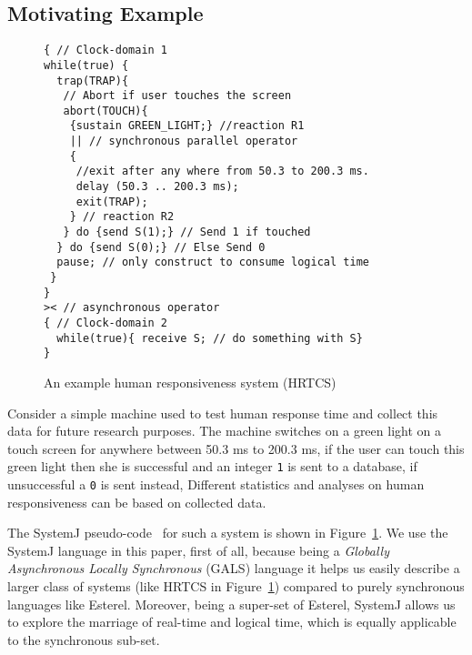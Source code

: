 \subsection{Motivating Example}
\label{sec:motivating-example}

\begin{figure}[t!]
\begin{minipage}{5cm}
  \begin{scriptsize}
    
\begin{verbatim}
{ // Clock-domain 1
while(true) {
  trap(TRAP){
   // Abort if user touches the screen
   abort(TOUCH){
    {sustain GREEN_LIGHT;} //reaction R1
    || // synchronous parallel operator
    {
     //exit after any where from 50.3 to 200.3 ms.
     delay (50.3 .. 200.3 ms); 
     exit(TRAP); 
    } // reaction R2
   } do {send S(1);} // Send 1 if touched 
  } do {send S(0);} // Else Send 0
  pause; // only construct to consume logical time
 }
}
>< // asynchronous operator
{ // Clock-domain 2
  while(true){ receive S; // do something with S}
}
\end{verbatim}
  \end{scriptsize}
\end{minipage}
\caption{An example human responsiveness system (HRTCS)}
\label{fig:1}
\end{figure}

Consider a simple machine used to test human response time and collect
this data for future research purposes. The machine switches on a green
light on a touch screen for anywhere between 50.3 ms to 200.3 ms, if the
user can touch this green light then she is successful and an integer
\texttt{1} is sent to a database, if unsuccessful a \texttt{0} is sent
instead, Different statistics and analyses on human responsiveness can
be based on collected data.

The SystemJ pseudo-code~\cite{amal10} for such a system is shown in
Figure~\ref{fig:1}. We use the SystemJ language in this paper, first of
all, because being a \textit{Globally Asynchronous Locally Synchronous}
(GALS) language it helps us easily describe a larger class of systems
(like HRTCS in Figure~\ref{fig:1}) compared to purely synchronous
languages like Esterel. Moreover, being a super-set of Esterel, SystemJ
allows us to explore the marriage of real-time and logical time, which
is equally applicable to the synchronous sub-set.

